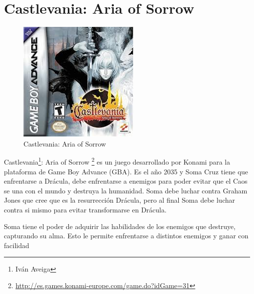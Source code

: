 \section{Castlevania: Aria of Sorrow}

\begin{figure}[htbp]
\begin{center}
\includegraphics[width=.60\textwidth]{./imagenes/castlevaniaAOS.jpg}
\caption{Castlevania: Aria of Sorrow}
\label{Zelda: Skyward Sword}
\end{center}
\end{figure}
Castlevania\footnote{Iván Aveiga}: Aria of Sorrow \footnote{\url{http://es.games.konami-europe.com/game.do?idGame=31}} es un juego desarrollado por Konami para la plataforma de Game Boy Advance (GBA). Es el año 2035 y Soma Cruz tiene que enfrentarse a Drácula, debe enfrentarse a enemigos para poder evitar que el Caos se una con el mundo y destruya la humanidad. Soma debe luchar contra Graham Jones que cree que es la resurrección Drácula, pero al final Soma debe luchar contra si mismo para evitar transformarse en Drácula.

Soma tiene el poder de adquirir las habilidades de los enemigos que destruye, capturando su alma. Esto le permite enfrentarse a distintos enemigos y ganar con facilidad

